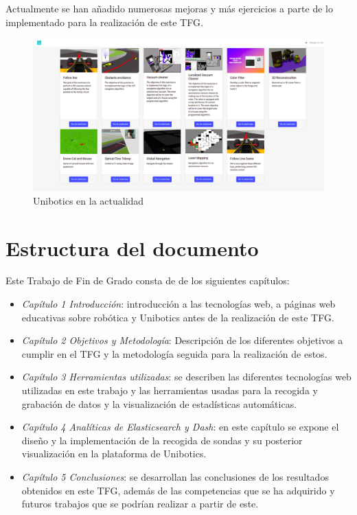 Actualmente se han añadido numerosas mejoras y más ejercicios a parte de lo implementado para la realización de este TFG.

\begin{figure}[H]
    \centering
    \includegraphics[width=15cm, keepaspectratio]{img/unibotics.png}
    \caption{Unibotics en la actualidad}
    \label{fig:unibotics}
\end{figure}

\newpage
\section{Estructura del documento}

Este Trabajo de Fin de Grado consta de de los siguientes capítulos:

\begin{itemize}
    \item \textit{Capítulo 1 Introducción}: introducción a las tecnologías web, a páginas web educativas sobre robótica y Unibotics antes de la realización de este TFG.
    \item \textit{Capítulo 2 Objetivos y Metodología}: Descripción de los diferentes objetivos a cumplir en el TFG y la metodología seguida para la realización de estos.
    \item \textit{Capítulo 3 Herramientas utilizadas}: se describen las diferentes tecnologías web utilizadas en este trabajo y las herramientas usadas para la recogida y grabación de datos y la visualización de estadísticas automáticas.
   \item \textit{Capítulo 4 Analíticas de Elasticsearch y Dash}: en este capítulo se expone el diseño y la implementación de la recogida de sondas y su posterior visualización en la plataforma de Unibotics.
  \item \textit{Capítulo 5 Conclusiones}: se desarrollan las conclusiones de los resultados obtenidos en este TFG, además de las competencias que se ha adquirido y futuros trabajos que se podrían realizar a partir de este.
   \end{itemize}